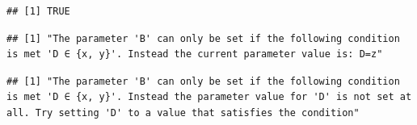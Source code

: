\documentclass[]{scrbook}
\newenvironment{Shaded}{\begin{snugshade}}{\end{snugshade}}
\newcommand{\CommentTok}[1]{\textcolor[rgb]{0.56,0.35,0.01}{\textit{#1}}}
\newcommand{\DataTypeTok}[1]{\textcolor[rgb]{0.13,0.29,0.53}{#1}}
\newcommand{\DecValTok}[1]{\textcolor[rgb]{0.00,0.00,0.81}{#1}}
\newcommand{\KeywordTok}[1]{\textcolor[rgb]{0.13,0.29,0.53}{\textbf{#1}}}
\newcommand{\NormalTok}[1]{#1}
\newcommand{\OperatorTok}[1]{\textcolor[rgb]{0.81,0.36,0.00}{\textbf{#1}}}
\newcommand{\OtherTok}[1]{\textcolor[rgb]{0.56,0.35,0.01}{#1}}
\newcommand{\StringTok}[1]{\textcolor[rgb]{0.31,0.60,0.02}{#1}}
\renewenvironment{Shaded} {\begin{snugshade}\small} {\end{snugshade}}
\begin{document}
\begin{Shaded}
\end{Shaded}

\begin{verbatim}
## [1] TRUE
\end{verbatim}

\begin{Shaded}
\end{Shaded}

\begin{verbatim}
## [1] "The parameter 'B' can only be set if the following condition is met 'D ∈ {x, y}'. Instead the current parameter value is: D=z"
\end{verbatim}

\begin{Shaded}
\end{Shaded}

\begin{verbatim}
## [1] "The parameter 'B' can only be set if the following condition is met 'D ∈ {x, y}'. Instead the parameter value for 'D' is not set at all. Try setting 'D' to a value that satisfies the condition"
\end{verbatim}

\begin{Shaded}
\end{Shaded}
\end{document}
